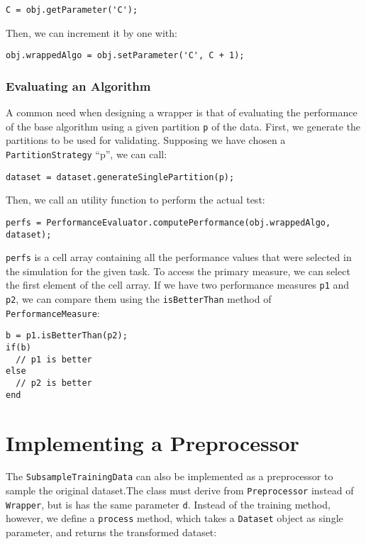 \begin{lstlisting}
C = obj.getParameter('C');
\end{lstlisting}

\noindent Then, we can increment it by one with:

\begin{lstlisting}
obj.wrappedAlgo = obj.setParameter('C', C + 1);
\end{lstlisting}

\subsubsection{Evaluating an Algorithm}

A common need when designing a wrapper is that of evaluating the performance of the base algorithm using a given partition \verb|p| of the data. First, we generate the partitions to be used for validating. Supposing we have chosen a \verb|PartitionStrategy| ``p'', we can call:

\begin{lstlisting}
dataset = dataset.generateSinglePartition(p);
\end{lstlisting}

\noindent Then, we call an utility function to perform the actual test:

\begin{lstlisting}
perfs = PerformanceEvaluator.computePerformance(obj.wrappedAlgo, dataset);
\end{lstlisting}

\noindent \verb|perfs| is a cell array containing all the performance values that were selected in the simulation for the given task. To access the primary measure, we can select the first element of the cell array. If we have two performance measures \verb|p1| and \verb|p2|, we can compare them using the \verb|isBetterThan| method of \verb|PerformanceMeasure|:

\begin{lstlisting}
b = p1.isBetterThan(p2);
if(b)
  // p1 is better
else
  // p2 is better
end
\end{lstlisting} 

\section{Implementing a Preprocessor}

The \verb|SubsampleTrainingData| can also be implemented as a preprocessor to sample the original dataset.The class must derive from \verb|Preprocessor| instead of \verb|Wrapper|, but is has the same parameter \verb|d|. Instead of the training method, however, we define a \verb|process| method, which takes a \verb|Dataset| object as single parameter, and returns the transformed dataset:

